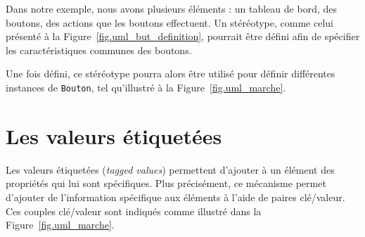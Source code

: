Dans notre exemple, nous avons plusieurs éléments : un tableau de bord, des boutons, des actions que les boutons effectuent.
Un stéréotype, comme celui présenté à la Figure~\ref{fig.uml_but_definition}, pourrait être d\'efini afin de sp\'ecifier les caractéristiques communes des boutons.




Une fois d\'efini, ce st\'er\'eotype pourra alors \^etre utilis\'e pour
d\'efinir diff\'erentes instances de \texttt{Bouton}, tel qu'illustré à la Figure~\ref{fig.uml_marche}.



\section{Les valeurs \'etiquet\'ees}

Les valeurs \'etiquet\'ees (\emph{tagged values}) permettent d'ajouter \`a un \'el\'ement des propriétés qui lui sont spécifiques.
Plus pr\'ecis\'ement, ce m\'ecanisme permet d'ajouter de l'information spécifique aux éléments \`a l'aide de paires clé/valeur.
Ces couples clé/valeur sont indiqués comme illustré dans la Figure~\ref{fig.uml_marche}.


